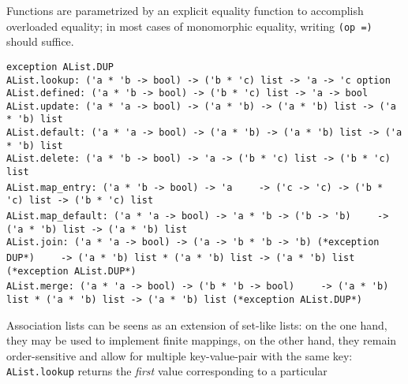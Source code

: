 \begin{isabellebody}
\begin{isamarkuptext}
  Functions are parametrized by an explicit equality function
  to accomplish overloaded equality;  in most cases of monomorphic
  equality, writing \verb|(op =)| should suffice.%
\end{isamarkuptext}%
\isamarkuptrue%
%
\isamarkuptrue%
%
\begin{isamarkuptext}%
\begin{mldecls}
  \verb|exception AList.DUP| \\
  \verb|AList.lookup: ('a * 'b -> bool) -> ('b * 'c) list -> 'a -> 'c option| \\
  \verb|AList.defined: ('a * 'b -> bool) -> ('b * 'c) list -> 'a -> bool| \\
  \verb|AList.update: ('a * 'a -> bool) -> ('a * 'b) -> ('a * 'b) list -> ('a * 'b) list| \\
  \verb|AList.default: ('a * 'a -> bool) -> ('a * 'b) -> ('a * 'b) list -> ('a * 'b) list| \\
  \verb|AList.delete: ('a * 'b -> bool) -> 'a -> ('b * 'c) list -> ('b * 'c) list| \\
  \verb|AList.map_entry: ('a * 'b -> bool) -> 'a|\isasep\isanewline%
\verb|    -> ('c -> 'c) -> ('b * 'c) list -> ('b * 'c) list| \\
  \verb|AList.map_default: ('a * 'a -> bool) -> 'a * 'b -> ('b -> 'b)|\isasep\isanewline%
\verb|    -> ('a * 'b) list -> ('a * 'b) list| \\
  \verb|AList.join: ('a * 'a -> bool) -> ('a -> 'b * 'b -> 'b) (*exception DUP*)|\isasep\isanewline%
\verb|    -> ('a * 'b) list * ('a * 'b) list -> ('a * 'b) list (*exception AList.DUP*)| \\
  \verb|AList.merge: ('a * 'a -> bool) -> ('b * 'b -> bool)|\isasep\isanewline%
\verb|    -> ('a * 'b) list * ('a * 'b) list -> ('a * 'b) list (*exception AList.DUP*)|
  \end{mldecls}%
\end{isamarkuptext}%
\isamarkuptrue%
%
\begin{isamarkuptext}%
Association lists can be seens as an extension of set-like lists:
  on the one hand, they may be used to implement finite mappings,
  on the other hand, they remain order-sensitive and allow for
  multiple key-value-pair with the same key: \verb|AList.lookup|
  returns the \emph{first} value corresponding to a particular

\end{isamarkuptext}
\end{isabellebody}
